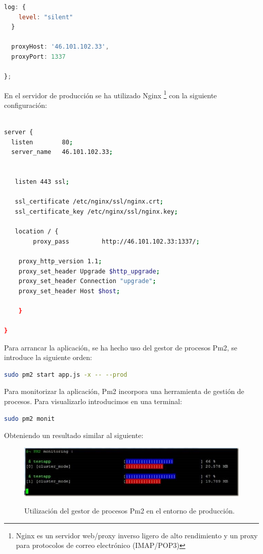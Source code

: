 \begin{appendix}
\begin{lstlisting}[language=JavaScript]
  log: {
    level: "silent"
  }

  proxyHost: '46.101.102.33',
  proxyPort: 1337

};
\end{lstlisting}

En el servidor de producción se ha utilizado Nginx \footnote{Nginx es un servidor web/proxy inverso ligero de alto rendimiento y un proxy para protocolos de correo electrónico (IMAP/POP3)} 
con la siguiente configuración:\\

\begin{lstlisting}[language=bash]

server {
  listen        80;
  server_name   46.101.102.33;


   listen 443 ssl;

   ssl_certificate /etc/nginx/ssl/nginx.crt;
   ssl_certificate_key /etc/nginx/ssl/nginx.key;

   location / {
        proxy_pass         http://46.101.102.33:1337/;

	proxy_http_version 1.1;
	proxy_set_header Upgrade $http_upgrade;
	proxy_set_header Connection "upgrade";
	proxy_set_header Host $host;

    }

}

\end{lstlisting}

Para arrancar la aplicación, se ha hecho uso del gestor de procesos Pm2, se introduce la siguiente orden: \\

\begin{lstlisting}[language=bash]
  sudo pm2 start app.js -x -- --prod
\end{lstlisting}


Para monitorizar la aplicación, Pm2 incorpora una herramienta de gestión de procesos. Para visualizarlo introducimos en una terminal:\\

\begin{lstlisting}[language=bash]
  sudo pm2 monit
\end{lstlisting}


Obteniendo un resultado similar al siguiente:

\begin{figure}[H]
  \begin{center}
    \includegraphics[scale=0.8]{imagenes/pm2-monit.jpg}\\
    \caption{Utilización del gestor de procesos Pm2 en el entorno de producción.}
  \end{center}
\end{figure}



\end{appendix}





